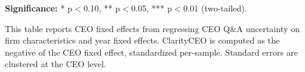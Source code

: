 \begin{table}[htbp]
\begin{tablenotes}[flushleft]
\item \textbf{Significance:} * p$<$0.10, ** p$<$0.05, *** p$<$0.01 (two-tailed).
\end{tablenotes}

\end{table}


\begin{table}[htbp]
\centering
\caption{Table 1: CEO Clarity Fixed Effects (Panel Format)}
\label{tab:ceo_clarity_panel}

\vspace{0.5em}
\parbox{\textwidth}{\small This table reports CEO fixed effects from regressing CEO Q\&A uncertainty on firm characteristics and year fixed effects. ClarityCEO is computed as the negative of the CEO fixed effect, standardized per-sample. Standard errors are clustered at the CEO level.}


\end{table}
